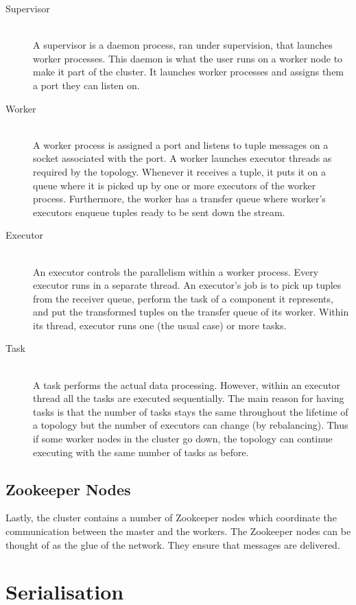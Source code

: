 \documentclass[bsc,logo,frontabs,twoside,singlespacing,normalheadings,parskip]{infthesis}     %
\begin{document}
\begin{description}
	\item[Supervisor] \hfill \\
	A supervisor is a daemon process, ran under supervision, that launches worker processes. This daemon is what the user runs on a worker node to make it part of the cluster. It launches worker processes and assigns them a port they can listen on.
	\item[Worker] \hfill \\
	A worker process is assigned a port and listens to tuple messages on a socket associated with the port. A worker launches executor threads as required by the topology. Whenever it receives a tuple, it puts it on a queue where it is picked up by one or more executors of the worker process. Furthermore, the worker has a transfer queue where worker's executors enqueue tuples ready to be sent down the stream.
	\item[Executor] \hfill \\
	An executor controls the parallelism within a worker process. Every executor runs in a separate thread. An executor's job is to pick up tuples from the receiver queue, perform the task of a component it represents, and put the transformed tuples on the transfer queue of its worker. Within its thread, executor runs one (the usual case) or more tasks.
	\item[Task] \hfill \\
	A task performs the actual data processing. However, within an executor thread all the tasks are executed sequentially. The main reason for having tasks is that the number of tasks stays the same throughout the lifetime of a topology but the number of executors can change (by rebalancing). Thus if some worker nodes in the cluster go down, the topology can continue executing with the same number of tasks as before.
\end{description}

\subsection{Zookeeper Nodes}

Lastly, the cluster contains a number of Zookeeper nodes which coordinate the communication between the master and the workers. The Zookeeper nodes can be thought of as the glue of the network. They ensure that messages are delivered.

\section{Serialisation}
\label{sec:serialisation}
\end{document}
